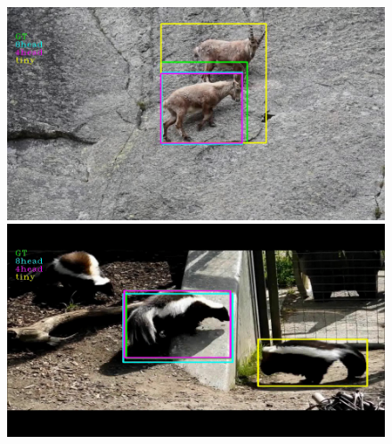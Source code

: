 \begin{figure}[H]
	\centerline{
	\includegraphics[width=0.5\linewidth]{images/results/success/project_52}
	\quad
	\includegraphics[width=0.5\linewidth]{images/results/success/project_161}}
	\caption{\textRL{}}
	\label{fig:my_model_result_success1}
\end{figure}

